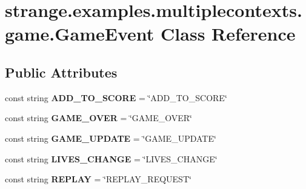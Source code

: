 \hypertarget{classstrange_1_1examples_1_1multiplecontexts_1_1game_1_1_game_event}{\section{strange.\-examples.\-multiplecontexts.\-game.\-Game\-Event Class Reference}
\label{classstrange_1_1examples_1_1multiplecontexts_1_1game_1_1_game_event}
}
\subsection*{Public Attributes}
\begin{DoxyCompactItemize}
\item 
\hypertarget{classstrange_1_1examples_1_1multiplecontexts_1_1game_1_1_game_event_a1c397a9ea3801279d86b4e11438e16de}{const string {\bfseries A\-D\-D\-\_\-\-T\-O\-\_\-\-S\-C\-O\-R\-E} = \char`\"{}A\-D\-D\-\_\-\-T\-O\-\_\-\-S\-C\-O\-R\-E\char`\"{}}\label{classstrange_1_1examples_1_1multiplecontexts_1_1game_1_1_game_event_a1c397a9ea3801279d86b4e11438e16de}

\item 
\hypertarget{classstrange_1_1examples_1_1multiplecontexts_1_1game_1_1_game_event_a162cc3d0f48b4d79cae0dca40cffca51}{const string {\bfseries G\-A\-M\-E\-\_\-\-O\-V\-E\-R} = \char`\"{}G\-A\-M\-E\-\_\-\-O\-V\-E\-R\char`\"{}}\label{classstrange_1_1examples_1_1multiplecontexts_1_1game_1_1_game_event_a162cc3d0f48b4d79cae0dca40cffca51}

\item 
\hypertarget{classstrange_1_1examples_1_1multiplecontexts_1_1game_1_1_game_event_aefae68aceefa8b520234900202f6702b}{const string {\bfseries G\-A\-M\-E\-\_\-\-U\-P\-D\-A\-T\-E} = \char`\"{}G\-A\-M\-E\-\_\-\-U\-P\-D\-A\-T\-E\char`\"{}}\label{classstrange_1_1examples_1_1multiplecontexts_1_1game_1_1_game_event_aefae68aceefa8b520234900202f6702b}

\item 
\hypertarget{classstrange_1_1examples_1_1multiplecontexts_1_1game_1_1_game_event_a35aba2c54045497299bea47a9bfbdca8}{const string {\bfseries L\-I\-V\-E\-S\-\_\-\-C\-H\-A\-N\-G\-E} = \char`\"{}L\-I\-V\-E\-S\-\_\-\-C\-H\-A\-N\-G\-E\char`\"{}}\label{classstrange_1_1examples_1_1multiplecontexts_1_1game_1_1_game_event_a35aba2c54045497299bea47a9bfbdca8}

\item 
\hypertarget{classstrange_1_1examples_1_1multiplecontexts_1_1game_1_1_game_event_a158b529fe46b74556f0c3851d52e278e}{const string {\bfseries R\-E\-P\-L\-A\-Y} = \char`\"{}R\-E\-P\-L\-A\-Y\-\_\-\-R\-E\-Q\-U\-E\-S\-T\char`\"{}}\label{classstrange_1_1examples_1_1multiplecontexts_1_1game_1_1_game_event_a158b529fe46b74556f0c3851d52e278e}


\end{DoxyCompactItemize}
